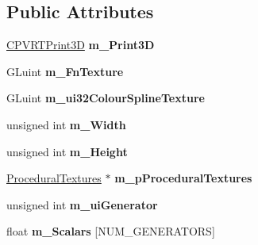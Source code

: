 \subsection*{Public Attributes}
\begin{DoxyCompactItemize}
\item 
\hypertarget{class_o_g_l_e_s2_procedural_textures_a0f9cb7ee7ca9bc58d0eae29fb2531829}{\hyperlink{class_c_p_v_r_t_print3_d}{C\+P\+V\+R\+T\+Print3\+D} {\bfseries m\+\_\+\+Print3\+D}}\label{class_o_g_l_e_s2_procedural_textures_a0f9cb7ee7ca9bc58d0eae29fb2531829}

\item 
\hypertarget{class_o_g_l_e_s2_procedural_textures_ad984da771452b6b4d40931c21cd08a57}{G\+Luint {\bfseries m\+\_\+\+Fn\+Texture}}\label{class_o_g_l_e_s2_procedural_textures_ad984da771452b6b4d40931c21cd08a57}

\item 
\hypertarget{class_o_g_l_e_s2_procedural_textures_a0c4de48e79fb74d3e5da6aba138cfb89}{G\+Luint {\bfseries m\+\_\+ui32\+Colour\+Spline\+Texture}}\label{class_o_g_l_e_s2_procedural_textures_a0c4de48e79fb74d3e5da6aba138cfb89}

\item 
\hypertarget{class_o_g_l_e_s2_procedural_textures_a3be465778c2167bff9eb8716a6871462}{unsigned int {\bfseries m\+\_\+\+Width}}\label{class_o_g_l_e_s2_procedural_textures_a3be465778c2167bff9eb8716a6871462}

\item 
\hypertarget{class_o_g_l_e_s2_procedural_textures_a6587e7563333631ad0c3303cc88039cd}{unsigned int {\bfseries m\+\_\+\+Height}}\label{class_o_g_l_e_s2_procedural_textures_a6587e7563333631ad0c3303cc88039cd}

\item 
\hypertarget{class_o_g_l_e_s2_procedural_textures_a4149bde959b2fdda75dad52d42bba4ba}{\hyperlink{class_procedural_textures}{Procedural\+Textures} $\ast$ {\bfseries m\+\_\+p\+Procedural\+Textures}}\label{class_o_g_l_e_s2_procedural_textures_a4149bde959b2fdda75dad52d42bba4ba}

\item 
\hypertarget{class_o_g_l_e_s2_procedural_textures_a4c178698ad6248ed099369b3347b26b7}{unsigned int {\bfseries m\+\_\+ui\+Generator}}\label{class_o_g_l_e_s2_procedural_textures_a4c178698ad6248ed099369b3347b26b7}

\item 
\hypertarget{class_o_g_l_e_s2_procedural_textures_aac237814d84873aa54446b090d96a536}{float {\bfseries m\+\_\+\+Scalars} \mbox{[}N\+U\+M\+\_\+\+G\+E\+N\+E\+R\+A\+T\+O\+R\+S\mbox{]}}\label{class_o_g_l_e_s2_procedural_textures_aac237814d84873aa54446b090d96a536}


\end{DoxyCompactItemize}
